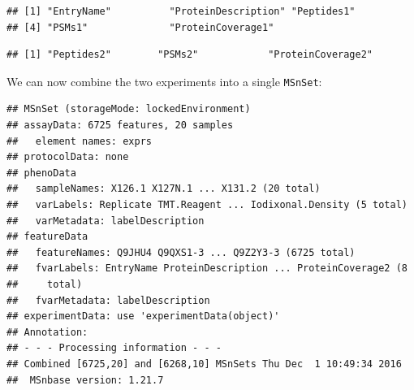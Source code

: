 \begin{knitrout}
\color{fgcolor}\begin{kframe}
\begin{alltt}
\hlstd{(hyperLOPIT2015ms3r1)[}\hlopt{:}\hlstd{]} \hlkwb{<-} \hlstd{(}\hlstd{(hyperLOPIT2015ms3r1)[}\hlopt{:}\hlstd{],} \hlstd{)}
\hlstd{(hyperLOPIT2015ms3r2)[}\hlopt{:}\hlstd{]} \hlkwb{<-} \hlstd{(}\hlstd{(hyperLOPIT2015ms3r2)[}\hlopt{:}\hlstd{],} \hlstd{)}
 \hlkwb{<-} \hlstd{(hyperLOPIT2015ms3r1)[}\hlopt{:}\hlstd{]}
 \hlkwb{<-} \hlstd{(hyperLOPIT2015ms3r2)[}\hlopt{:}\hlstd{]}
\end{alltt}
\begin{verbatim}
## [1] "EntryName"          "ProteinDescription" "Peptides1"         
## [4] "PSMs1"              "ProteinCoverage1"
\end{verbatim}
\begin{alltt}
\end{alltt}
\begin{verbatim}
## [1] "Peptides2"        "PSMs2"            "ProteinCoverage2"
\end{verbatim}
\end{kframe}
\end{knitrout}

We can now combine the two experiments into a single \texttt{MSnSet}:

\begin{knitrout}
\color{fgcolor}\begin{kframe}
\begin{alltt}
 \hlkwb{<-} 
\end{alltt}
\begin{verbatim}
## MSnSet (storageMode: lockedEnvironment)
## assayData: 6725 features, 20 samples 
##   element names: exprs 
## protocolData: none
## phenoData
##   sampleNames: X126.1 X127N.1 ... X131.2 (20 total)
##   varLabels: Replicate TMT.Reagent ... Iodixonal.Density (5 total)
##   varMetadata: labelDescription
## featureData
##   featureNames: Q9JHU4 Q9QXS1-3 ... Q9Z2Y3-3 (6725 total)
##   fvarLabels: EntryName ProteinDescription ... ProteinCoverage2 (8
##     total)
##   fvarMetadata: labelDescription
## experimentData: use 'experimentData(object)'
## Annotation:  
## - - - Processing information - - -
## Combined [6725,20] and [6268,10] MSnSets Thu Dec  1 10:49:34 2016 
##  MSnbase version: 1.21.7
\end{verbatim}
\end{kframe}
\end{knitrout}

